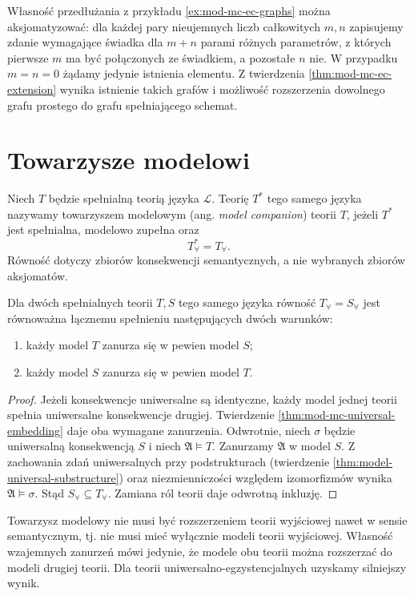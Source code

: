 Własność przedłużania z przykładu
\ref{ex:mod-mc-ec-graphs} można aksjomatyzować:
dla każdej pary nieujemnych liczb całkowitych
$m,n$ zapisujemy zdanie wymagające świadka dla
$m+n$ parami różnych parametrów, z których pierwsze
$m$ ma być połączonych ze świadkiem, a pozostałe
$n$ nie. W przypadku $m=n=0$ żądamy jedynie
istnienia elementu. Z twierdzenia
\ref{thm:mod-mc-ec-extension} wynika istnienie
takich grafów i możliwość rozszerzenia dowolnego
grafu prostego do grafu spełniającego schemat.
\section{Towarzysze modelowi}
\begin{definicja}
\label{def:mod-mc-companion}
Niech $T$ będzie spełnialną teorią języka $\mathcal L$.
Teorię $T^*$ tego samego języka nazywamy towarzyszem
modelowym (ang. \emph{model companion}) teorii $T$,
jeżeli $T^*$ jest spełnialna, modelowo zupełna oraz
\[
T^*_{\forall}=T_{\forall}.
\]
Równość dotyczy zbiorów konsekwencji semantycznych,
a nie wybranych zbiorów aksjomatów.
\end{definicja}

\begin{lemat}
\label{lem:mod-mc-mutual-embedding}
Dla dwóch spełnialnych teorii $T,S$ tego samego języka
równość $T_{\forall}=S_{\forall}$ jest równoważna
łącznemu spełnieniu następujących dwóch warunków:
\begin{enumerate}
\item każdy model $T$ zanurza się w pewien model $S$;
\item każdy model $S$ zanurza się w pewien model $T$.
\end{enumerate}
\end{lemat}
\begin{proof}
Jeżeli konsekwencje uniwersalne są identyczne,
każdy model jednej teorii spełnia uniwersalne
konsekwencje drugiej. Twierdzenie
\ref{thm:mod-mc-universal-embedding} daje oba
wymagane zanurzenia.
Odwrotnie, niech $\sigma$ będzie uniwersalną
konsekwencją $S$ i niech $\mathfrak A\models T$.
Zanurzamy $\mathfrak A$ w model $S$.
Z zachowania zdań uniwersalnych przy podstrukturach
(twierdzenie \ref{thm:model-universal-substructure})
oraz niezmienniczości względem izomorfizmów wynika
$\mathfrak A\models\sigma$. Stąd
$S_{\forall}\subseteq T_{\forall}$. Zamiana ról
teorii daje odwrotną inkluzję.
\end{proof}

Towarzysz modelowy nie musi być rozszerzeniem teorii
wyjściowej nawet w sensie semantycznym, tj. nie musi
mieć wyłącznie modeli teorii wyjściowej. Własność
wzajemnych zanurzeń mówi jedynie, że modele obu
teorii można rozszerzać do modeli drugiej teorii.
Dla teorii uniwersalno-egzystencjalnych uzyskamy
silniejszy wynik.


